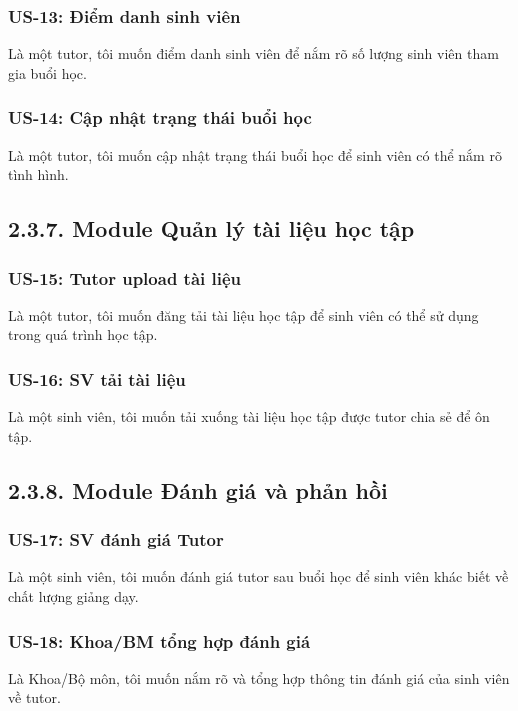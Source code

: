 \subsubsection*{US-13: Điểm danh sinh viên}
Là một tutor, tôi muốn điểm danh sinh viên để nắm rõ số lượng sinh viên tham gia buổi học.

\subsubsection*{US-14: Cập nhật trạng thái buổi học}
Là một tutor, tôi muốn cập nhật trạng thái buổi học để sinh viên có thể nắm rõ tình hình.
 
\subsection*{2.3.7. Module Quản lý tài liệu học tập}
\subsubsection*{US-15: Tutor upload tài liệu}
Là một tutor, tôi muốn đăng tải tài liệu học tập để sinh viên có thể sử dụng trong quá trình học tập.

\subsubsection*{US-16: SV tải tài liệu}
Là một sinh viên, tôi muốn tải xuống tài liệu học tập được tutor chia sẻ để ôn tập.

\subsection*{2.3.8. Module Đánh giá và phản hồi}
\subsubsection*{US-17: SV đánh giá Tutor} 
Là một sinh viên, tôi muốn đánh giá tutor sau buổi học để sinh viên khác biết về chất lượng giảng dạy.

\subsubsection*{US-18: Khoa/BM tổng hợp đánh giá} 
Là Khoa/Bộ môn, tôi muốn nắm rõ và tổng hợp thông tin đánh giá của sinh viên về tutor.

